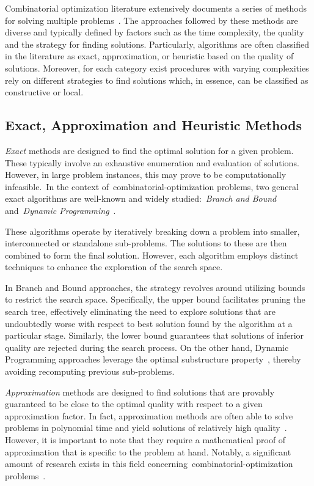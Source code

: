 Combinatorial optimization literature extensively documents a series of methods
for solving multiple
problems~\cite{papadimitriou1998combinatorial,yu2010combinatorial,luke2013essentialsa}.
The approaches followed by these methods are diverse and typically defined by
factors such as the time complexity, the quality and the strategy for finding
solutions. Particularly, algorithms are often classified in the literature as
exact, approximation, or heuristic based on the quality of solutions. Moreover,
for each category exist procedures with varying complexities rely on different
strategies to find solutions which, in essence, can be classified as
constructive or local.

\subsection{Exact, Approximation and Heuristic Methods}
\label{subsec:approaches}

\emph{Exact} methods are designed to find the optimal solution for a given
problem. These typically involve an exhaustive enumeration and evaluation of
solutions. However, in large problem instances, this may prove to be
computationally infeasible.~In the context
of~\acrshort{combinatorial-optimization} problems, two general exact algorithms
are well-known and widely studied:~\textit{Branch and Bound} and~\textit{Dynamic
  Programming}~\cite{clausenbranch,festa2014brief}.

These algorithms operate by iteratively breaking down a problem into smaller,
interconnected or standalone sub-problems. The solutions to these are then
combined to form the final solution. However, each algorithm employs distinct
techniques to enhance the exploration of the search space.

In Branch and Bound approaches, the strategy revolves around utilizing bounds to
restrict the search space. Specifically, the upper bound facilitates pruning the
search tree, effectively eliminating the need to explore solutions that are
undoubtedly worse with respect to best solution found by the algorithm at a
particular stage. Similarly, the lower bound guarantees that solutions of
inferior quality are rejected during the search process. On the other hand,
Dynamic Programming approaches leverage the optimal substructure
property~\cite{festa2014brief}, thereby avoiding recomputing previous
sub-problems.

\emph{Approximation} methods are designed to find solutions that are provably
guaranteed to be close to the optimal quality with respect to a given
approximation factor. In fact, approximation methods are often able to solve
problems in polynomial time and yield solutions of relatively high
quality~\cite{williamson2011design}.  However, it is important to note that
they require a mathematical proof of approximation that is specific to the
problem at hand. Notably, a significant amount of research exists in this field
concerning~\acrshort{combinatorial-optimization}
problems~\cite{johnson1974approximation}.

